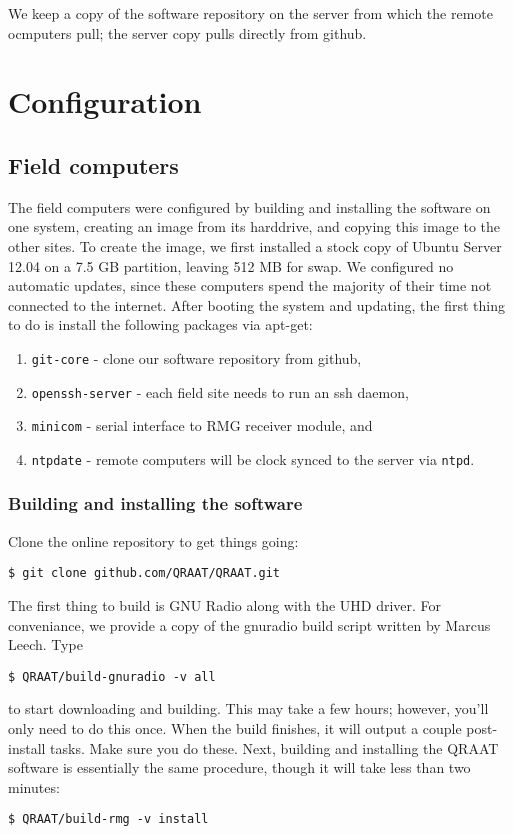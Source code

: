 \documentclass[letter]{article}
\begin{document}
We keep a copy of the software repository on the server from which the remote ocmputers pull; the server 
copy pulls directly from github. 




\section{Configuration}

\subsection{Field computers}
The field computers were configured by building and installing the software on one 
system, creating an image from its harddrive, and copying this image to the other sites. To create
the image, we first installed a stock copy of Ubuntu Server 12.04 on a 7.5 GB partition, leaving
512 MB for swap. We configured no automatic updates, since these computers spend the majority of 
their time not connected to the internet. After booting the system and updating, the first thing
to do is install the following packages via apt-get: 
\begin{enumerate}
  \item \texttt{git-core} - clone our software repository from github,
  \item \texttt{openssh-server} - each field site needs to run an ssh daemon,
  \item \texttt{minicom} - serial interface to RMG receiver module, and
  \item \texttt{ntpdate} - remote computers will be clock synced to the server via \texttt{ntpd}. 
\end{enumerate}

\subsubsection{Building and installing the software}
Clone the online repository to get things going:
\begin{verbatim}
$ git clone github.com/QRAAT/QRAAT.git
\end{verbatim}
The first thing to build is GNU Radio along with the UHD driver. For conveniance, we provide a copy 
of the gnuradio build script written by Marcus Leech. Type
\begin{verbatim}
$ QRAAT/build-gnuradio -v all
\end{verbatim}
to start downloading and building. This may take a few hours; however, you'll only need to do this once. When the 
build finishes, it will output a couple post-install tasks. Make sure you do these. Next, building
and installing the QRAAT software is essentially the same procedure, though it will take less than 
two minutes: 
\begin{verbatim}
$ QRAAT/build-rmg -v install
\end{verbatim}
\end{document}
